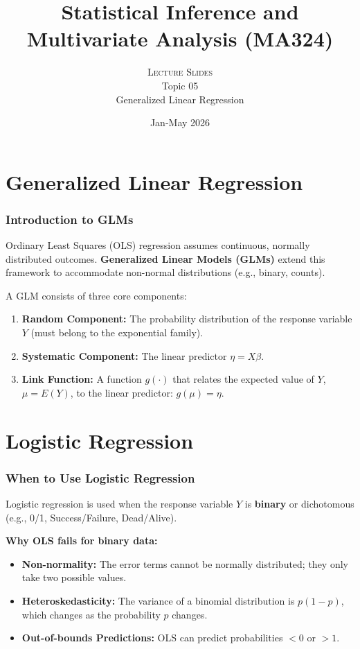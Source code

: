 \documentclass[10pt]{beamer} %
\title[]{Statistical Inference and Multivariate Analysis (MA324)}
\subtitle{\textsc{Lecture Slides}\\Topic 05\\ Generalized Linear Regression}
\date{Jan-May 2026}
\begin{document}
\thispagestyle{empty}
\maketitle

\section{Generalized Linear Regression}

\begin{frame}
    \frametitle{Introduction to GLMs}
    Ordinary Least Squares (OLS) regression assumes continuous, normally distributed outcomes. \textbf{Generalized Linear Models (GLMs)} extend this framework to accommodate non-normal distributions (e.g., binary, counts).
    
    \vspace{0.5cm}
    A GLM consists of three core components:
    \begin{enumerate}
        \item \textbf{Random Component:} The probability distribution of the response variable $Y$ (must belong to the exponential family).
        \item \textbf{Systematic Component:} The linear predictor $\eta = X\beta$.
        \item \textbf{Link Function:} A function $g(\cdot)$ that relates the expected value of $Y$, $\mu = E(Y)$, to the linear predictor: $g(\mu) = \eta$.
    \end{enumerate}
\end{frame}

\section{Logistic Regression}
\begin{frame}
    \frametitle{When to Use Logistic Regression}
    Logistic regression is used when the response variable $Y$ is \textbf{binary} or dichotomous (e.g., 0/1, Success/Failure, Dead/Alive).
    
    \vspace{0.5cm}
    \textbf{Why OLS fails for binary data:}
    \begin{itemize}
        \item \textbf{Non-normality:} The error terms cannot be normally distributed; they only take two possible values.
        \item \textbf{Heteroskedasticity:} The variance of a binomial distribution is $p(1-p)$, which changes as the probability $p$ changes.
        \item \textbf{Out-of-bounds Predictions:} OLS can predict probabilities $< 0$ or $> 1$.
    \end{itemize}
\end{frame}
\end{document}

